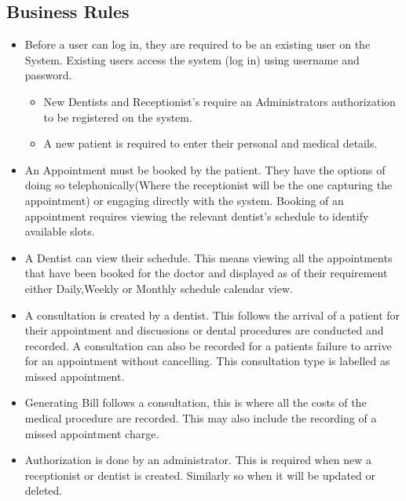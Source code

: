 \documentclass[11 pt]{article}
\begin{document}
\subsection{Business Rules}
\begin{itemize}
\item
Before a user can log in, they are required to be an existing user on the System. Existing users access the system (log in) using username and password.
\begin{itemize}
\item
New Dentists and Receptionist's require an Administrators authorization to be registered on the system.
\item
A new patient is required to enter their personal and medical details.
\end{itemize}
\item
An Appointment must be booked by the patient. They have the options of doing so telephonically(Where the receptionist will be the one capturing the appointment) or engaging directly with the system. Booking of an appointment requires viewing the relevant dentist's schedule to identify available slots.
\item
A Dentist can view their schedule. This means viewing all the appointments that have been booked for the doctor and displayed as of their requirement either Daily,Weekly or Monthly schedule calendar view.
\item
A consultation is created by a dentist. This follows the arrival of a patient for their appointment and discussions or dental procedures are conducted and recorded. A consultation can also be recorded for a patients failure to arrive for an appointment without cancelling. This consultation type is labelled as missed appointment.
\item
Generating Bill follows a consultation, this is where all the costs of the medical procedure are recorded. This may also include the recording of a missed appointment charge.
\item
Authorization is done by an administrator. This is required when new a receptionist or dentist is created. Similarly so when it will be updated or deleted.
\end{itemize}
\end{document}
